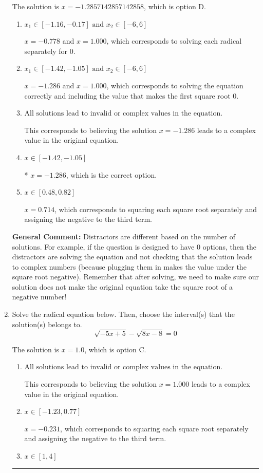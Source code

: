 \documentclass{extbook}[14pt]
\newcommand{\litem}[1]{\item #1

\rule{\textwidth}{0.4pt}}
\begin{document}
\begin{enumerate}
{The solution is \( x = -1.2857142857142858 \), which is option D.\begin{enumerate}[label=\Alph*.]
\item \( x_1 \in [-1.16, -0.17] \text{ and } x_2 \in [-6,6] \)

$x = -0.778$ and $x = 1.000$, which corresponds to solving each radical separately for 0.
\item \( x_1 \in [-1.42, -1.05] \text{ and } x_2 \in [-6,6] \)

$x = -1.286$ and $x = 1.000$, which corresponds to solving the equation correctly and including the value that makes the first square root 0.
\item \( \text{All solutions lead to invalid or complex values in the equation.} \)

This corresponds to believing the solution $x = -1.286$ leads to a complex value in the original equation.
\item \( x \in [-1.42,-1.05] \)

* $x = -1.286$, which is the correct option.
\item \( x \in [0.48,0.82] \)

$x = 0.714$, which corresponds to squaring each square root separately and assigning the negative to the third term.
\end{enumerate}

\textbf{General Comment:} Distractors are different based on the number of solutions. For example, if the question is designed to have 0 options, then the distractors are solving the equation and not checking that the solution leads to complex numbers (because plugging them in makes the value under the square root negative). Remember that after solving, we need to make sure our solution does not make the original equation take the square root of a negative number!
}
\litem{
Solve the radical equation below. Then, choose the interval(s) that the solution(s) belongs to.
\[ \sqrt{-5 x + 5} - \sqrt{8 x - 8} = 0 \]

The solution is \( x = 1.0 \), which is option C.\begin{enumerate}[label=\Alph*.]
\item \( \text{All solutions lead to invalid or complex values in the equation.} \)

This corresponds to believing the solution $x = 1.000$ leads to a complex value in the original equation.
\item \( x \in [-1.23,0.77] \)

$x = -0.231$, which corresponds to squaring each square root separately and assigning the negative to the third term.
\item \( x \in [1,4] \)


\end{enumerate}}
\end{enumerate}
\end{document}
